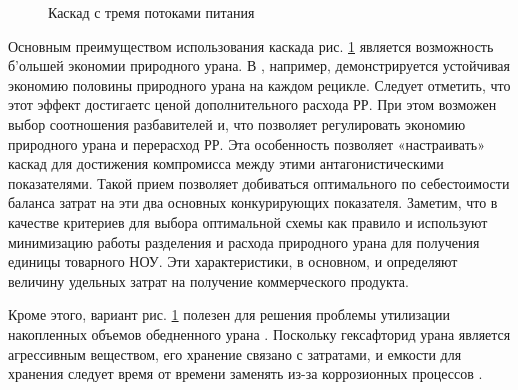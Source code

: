 \begin{figure}[ht]
  \caption{Каскад с тремя потоками питания}\label{fig:3_inputs}
\end{figure}

Основным преимуществом использования каскада рис. \ref{fig:3_inputs} является возможность б'ольшей экономии природного урана.
В \cite{smirnovApplyingEnrichmentCapacities2018}, например, демонстрируется устойчивая экономию половины природного урана на каждом рецикле. Следует отметить, что этот эффект достигаетс ценой дополнительного расхода РР. При этом возможен выбор соотношения разбавителей и, что позволяет регулировать экономию природного урана и перерасход РР.
Эта особенность позволяет «настраивать» каскад для достижения компромисса между этими антагонистическими показателями.
Такой прием позволяет добиваться оптимального по себестоимости баланса затрат на эти два основных конкурирующих показателя.
Заметим, что в качестве критериев для выбора оптимальной схемы как правило и используют минимизацию работы разделения и расхода природного урана для получения единицы товарного НОУ. Эти характеристики, в основном, и определяют величину удельных затрат на получение коммерческого продукта.

Кроме этого, вариант рис. \ref{fig:3_inputs} полезен для решения проблемы утилизации накопленных объемов обедненного урана \cite{smirnovEnrichmentRegeneratedUranium2014}. Поскольку гексафторид урана является агрессивным веществом, его хранение связано с затратами, и емкости для хранения следует время от времени заменять из-за коррозионных процессов \cite{fitchOPTIONSDISPOSALREAPPLICATION2009, oecdManagementDepletedUranium2001}.

